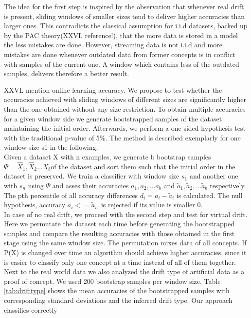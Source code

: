 \documentclass[conference]{IEEEtran}
\begin{document}
The idea for the first step is inspired by the observation that whenever real drift is present, sliding windows of smaller sizes tend to deliver higher accuracies than larger ones. 
This contradicts the classical assumption for i.i.d datasets, backed up by the PAC theory(XXVL reference!), that the more data is stored in a model the less mistakes are done. 
However, streaming data is not i.i.d and more mistakes are done whenever outdated data from former concepts is in conflict with samples of the current one. 
A window which contains less of the outdated samples, delivers therefore a better result. 

XXVL mention online learning accuracy.
We propose to test whether the accuracies achieved with sliding windows of different sizes are significantly higher than the one obtained without any size restriction. 
To obtain multiple accuracies for a given window side we generate bootstrapped samples of the dataset maintaining the initial order. 
Afterwards, we perform a one sided hypothesis test with the traditional p-value of 5\%.
The method is described exemplarly for one window size s1 in the following.\\
Given a dataset X with n examples, we generate b bootstrap samples $\Psi=\hat{X}_1,\hat{X}_2...{X}_b$of the dataset and sort them such that the initial order in the dataset is preserved. 
We train a classifier with window size $s_1$ and another one with $s_n$ using $\Psi$ and asses their accuracies $a_1,a_2,...a_b$ and $\tilde{a}_1,\tilde{a}_2,...\tilde{a}_b$ respectively.  
The pth percentile of all accuracy differences $d_i = a_i - \tilde{a}_i$ is calculated. The null hypothesis, accuracy $a_i <= \tilde{a}_i$, is rejected if its value is smaller 0.\\
In case of no real drift, we proceed with the second step and test for virtual drift. Here we permutate the dataset each time before generating the bootstrapped samples and compare
the resulting accuracies with those obtained in the first stage using the same window size. The permutation mixes data of all concepts. If P(X) is changed over time an 
algorithm should achieve higher accuracies, since it is easier to classify only one concept at a time instead of all of them together.\\
Next to the real world data we also analyzed the drift type of artificial data as a proof of concept. We used 200 bootstrap samples per window size.
Table \ref{tab:drifttype} shows the mean accuracies of the bootstrapped samples with corresponding standard deviations and the inferred drift type. Our approach classifies correctly
\end{document}

